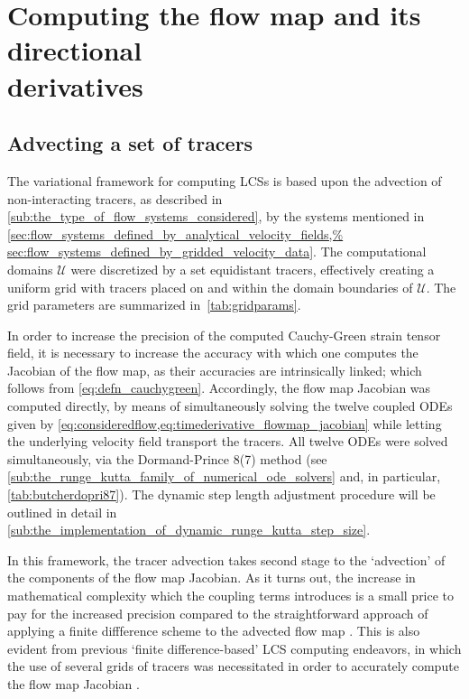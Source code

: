 \section[Computing the flow map and its directional derivatives]
{Computing the flow map and its directional\\ \phantom{3.2} derivatives}
\label{sec:computing_the_flow_map_and_its_directional_derivatives}

\subsection{Advecting a set of tracers}
\label{sub:advecting_a_set_of_tracers}

The variational framework for computing LCSs is based upon the advection of
non-interacting tracers, as described in
\cref{sub:the_type_of_flow_systems_considered}, by the systems mentioned in
\cref{sec:flow_systems_defined_by_analytical_velocity_fields,%
sec:flow_systems_defined_by_gridded_velocity_data}. The computational domains
$\mathcal{U}$ were discretized by a set equidistant tracers, effectively
creating a uniform grid with tracers placed on and within the domain boundaries
of $\mathcal{U}$. The grid parameters are summarized in~\cref{tab:gridparams}.



In order to increase the precision of the computed Cauchy-Green strain tensor
field, it is necessary to increase the accuracy with which one computes the
Jacobian of the flow map, as their accuracies are intrinsically linked;
which follows from \cref{eq:defn_cauchygreen}. Accordingly, the flow map
Jacobian was computed directly, by means of simultaneously solving the
twelve coupled ODEs given by
\cref{eq:consideredflow,eq:timederivative_flowmap_jacobian} while letting the
underlying velocity field transport the tracers. All twelve ODEs were solved
simultaneously, via the Dormand-Prince 8(7) method (see
\cref{sub:the_runge_kutta_family_of_numerical_ode_solvers} and, in particular,
\cref{tab:butcherdopri87}). The dynamic step length adjustment procedure
will be outlined in detail in
\cref{sub:the_implementation_of_dynamic_runge_kutta_step_size}.

In this framework, the tracer advection takes second stage to the `advection' of
the components of the flow map Jacobian. As it turns out, the increase in
mathematical complexity which the coupling terms introduces is a small price to
pay for the increased precision compared to the straightforward approach of
applying a finite diffference scheme to the advected flow map
\parencite{oettinger2016autonomous}. This is also evident from previous
`finite difference-based' LCS computing endeavors, in which the use of several
grids of tracers was necessitated in order to accurately compute the flow map
Jacobian \parencite{loken2017sensitivity,farazmand2012computing}.

